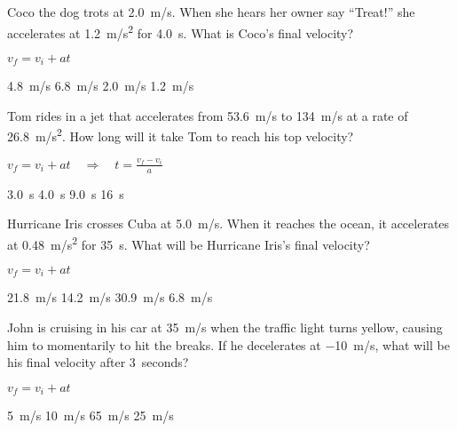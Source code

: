 \documentclass[../main-physics-problems.tex]{subfiles}
\begin{document}
\begin{questions}

\question
Coco the dog trots at \SI{2.0}{m/s}. When she hears her owner say ``Treat!'' she accelerates at \SI{1.2}{m/s^2} for \SI{4.0}{s}. What is Coco's final velocity?

\ifprintanswers
\bgroup
\color{red}
$v_f = v_i + at$
\egroup
\fi

\begin{choices}
    \choice \SI{4.8}{m/s}
    \correctchoice \SI{6.8}{m/s}
    \choice \SI{2.0}{m/s}
    \choice \SI{1.2}{m/s}
\end{choices}

\question 
Tom rides in a jet that accelerates from \SI{53.6}{m/s} to \SI{134}{m/s} at a rate of \SI{26.8}{m/s^2}. How long will it take Tom to reach his top velocity?

\ifprintanswers
\bgroup
\color{red}
$\displaystyle v_f = v_i + at \quad \Rightarrow \quad t = \frac{v_f - v_i}{a}$
\egroup
\fi

\begin{randomizechoices}
    \correctchoice \SI{3.0}{s}
    \choice \SI{4.0}{s}
    \choice \SI{9.0}{s}
    \choice \SI{16}{s}
\end{randomizechoices}


\question
Hurricane Iris crosses Cuba at \SI{5.0}{m/s}. When it reaches the ocean, it accelerates at \SI{0.48}{m/s^2} for \SI{35}{s}. What will be Hurricane Iris's final velocity?

\ifprintanswers
\bgroup
\color{red}
$v_f = v_i + at$
\egroup
\fi

\begin{randomizechoices}
    \correctchoice \SI{21.8}{m/s}
    \choice \SI{14.2}{m/s}
    \choice \SI{30.9}{m/s}
    \choice \SI{6.8}{m/s}
\end{randomizechoices}



\question
John is cruising in his car at \SI{35}{m/s} when the traffic light turns yellow, causing him to momentarily to hit the breaks. If he decelerates at \SI{-10}{m/s}, what will be his final velocity after \SI{3}{seconds}?

\ifprintanswers
\bgroup
\color{red}
$v_f = v_i + at$
\egroup
\fi

\begin{randomizechoices}
    \correctchoice \SI{5}{m/s}
    \choice \SI{10}{m/s}
    \choice \SI{65}{m/s}
    \choice \SI{25}{m/s}
\end{randomizechoices}


\end{questions}
\end{document}
